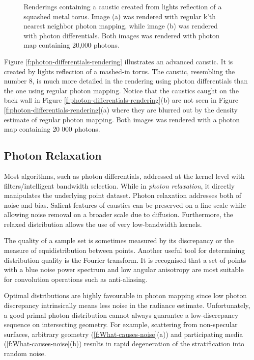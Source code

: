 \begin{figure}
\begin{center}
\begin{subfigure}[b]{0.48\textwidth}
	\end{subfigure}
\end{center}
\caption{Renderings containing a caustic created from lights reflection of a squashed metal torus. Image (a) was rendered with regular k'th nearest neighbor photon mapping, while image (b) was rendered with photon differentials. Both images was rendered with photon map containing 20,000 photons.}
\end{figure}

Figure \ref{f:photon-differentials-rendering} illustrates an advanced caustic. It is created by lights reflection of a mashed-in torus. The caustic, resembling the number 8, is much more detailed in the rendering using photon differentials than the one using regular photon mapping. Notice that the caustics caught on the back wall in Figure \ref{f:photon-differentials-rendering}(b) are not seen in Figure \ref{f:photon-differentials-rendering}(a) where they are blurred out by the density estimate of regular photon mapping. Both images was rendered with a photon map containing 20 000 photons.





\subsection{Photon Relaxation}
Most algorithms, such as photon differentials, addressed at the kernel level with filters/intelligent bandwidth selection. While in \textit{photon relaxation}\cite{a:IntotheBlue:BetterCausticsthroughPhotonRelaxation}, it directly manipulates the underlying point dataset. Photon relaxation addresses both of noise and bias. Salient features of caustics can be preserved on a fine scale while allowing noise removal on a broader scale due to diffusion. Furthermore, the relaxed distribution allows the use of very low-bandwidth kernels.

The quality of a sample set is sometimes measured by its discrepancy or the measure of equidistribution between points. Another useful tool for determining distribution quality is the Fourier transform. It is recognised that a set of points with a blue noise power spectrum and low angular anisotropy are most suitable for convolution operations such as anti-aliasing\cite[-20mm]{a:StochasticSamplinginComputerGraphics}.

Optimal distributions are highly favourable in photon mapping since low photon discrepancy intrinsically means less noise in the radiance estimate. Unfortunately, a good primal photon distribution cannot always guarantee a low-discrepancy sequence on intersecting geometry. For example, scattering from non-specular surfaces, arbitrary geometry (\ref{f:What-causes-noise}(a)) and participating media (\ref{f:What-causes-noise}(b)) results in rapid degeneration of the stratification into random noise.

